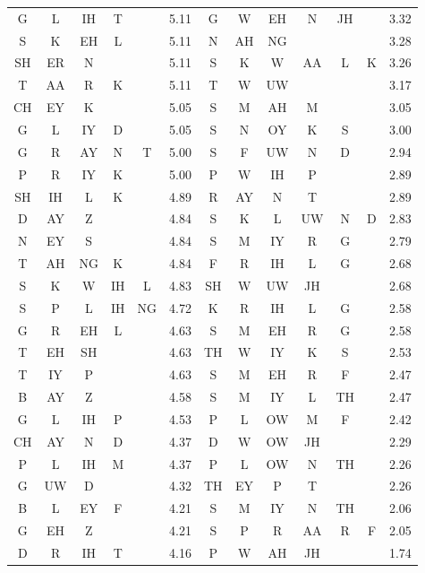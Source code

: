 \begin{center}
\begin{longtable}{c@{ } c@{ } c@{ } c@{ } c@{ } r | c c c c c c r}
G  & L  & IH & T  &   & 5.11  & G  & W  & EH & N  & JH &   & 3.32 \\
S  & K  & EH & L  &   & 5.11  & N  & AH & NG &    &    &   & 3.28 \\
SH & ER & N  &    &   & 5.11  & S  & K  & W  & AA & L  & K & 3.26 \\
T  & AA & R  & K  &   & 5.11  & T  & W  & UW &    &    &   & 3.17 \\
CH & EY & K  &    &   & 5.05  & S  & M  & AH & M  &    &   & 3.05 \\
G  & L  & IY & D  &   & 5.05  & S  & N  & OY & K  & S  &   & 3.00 \\
G  & R  & AY & N  & T & 5.00  & S  & F  & UW & N  & D  &   & 2.94 \\
P  & R  & IY & K  &   & 5.00  & P  & W  & IH & P  &    &   & 2.89 \\
SH & IH & L  & K  &   & 4.89  & R  & AY & N  & T  &    &   & 2.89 \\
D  & AY & Z  &    &   & 4.84  & S  & K  & L  & UW & N  & D & 2.83 \\
N  & EY & S  &    &   & 4.84  & S  & M  & IY & R  & G  &   & 2.79 \\
T  & AH & NG & K  &   & 4.84  & F  & R  & IH & L  & G  &   & 2.68 \\
S  & K  & W  & IH & L & 4.83  & SH & W  & UW & JH &    &   & 2.68 \\
S  & P  & L  & IH & NG& 4.72  & K  & R  & IH & L  & G  &   & 2.58 \\
G  & R  & EH & L  &   & 4.63  & S  & M  & EH & R  & G  &   & 2.58 \\
T  & EH & SH &    &   & 4.63  & TH & W  & IY & K  & S  &   & 2.53 \\
T  & IY & P  &    &   & 4.63  & S  & M  & EH & R  & F  &   & 2.47 \\
B  & AY & Z  &    &   & 4.58  & S  & M  & IY & L  & TH &   & 2.47 \\
G  & L  & IH & P  &   & 4.53  & P  & L  & OW & M  & F  &   & 2.42 \\
CH & AY & N  & D  &   & 4.37  & D  & W  & OW & JH &    &   & 2.29 \\
P  & L  & IH & M  &   & 4.37  & P  & L  & OW & N  & TH &   & 2.26 \\
G  & UW & D  &    &   & 4.32  & TH & EY & P  & T  &    &   & 2.26 \\
B  & L  & EY & F  &   & 4.21  & S  & M  & IY & N  & TH &   & 2.06 \\
G  & EH & Z  &    &   & 4.21  & S  & P  & R  & AA & R  & F & 2.05 \\
D  & R  & IH & T  &   & 4.16  & P  & W  & AH & JH &    &   & 1.74 \\
\bottomrule
\end{longtable}
\end{center}
